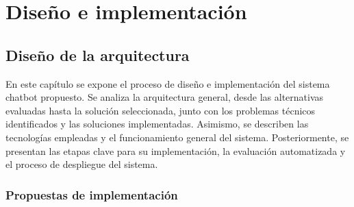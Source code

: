 \chapter{Diseño e implementación} 
\label{Chapter3} 

\section{Diseño de la arquitectura} 

En este capítulo se expone el proceso de diseño e implementación del sistema chatbot propuesto. Se analiza la arquitectura general, desde las alternativas evaluadas hasta la solución seleccionada, junto con los problemas técnicos identificados y las soluciones implementadas. Asimismo, se describen las tecnologías empleadas y el funcionamiento general del sistema. Posteriormente, se presentan las etapas clave para su implementación, la evaluación automatizada y el proceso de despliegue del sistema.


\subsection{Propuestas de implementación} 

